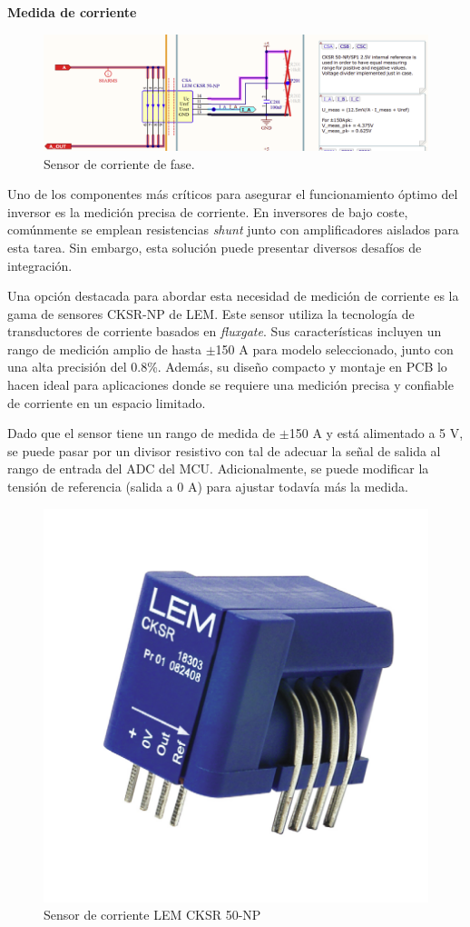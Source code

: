 \textbf{Medida de corriente}

\begin{figure}[H]
	\centering
	\includegraphics[width=0.8\linewidth]{fig/Imeas-sch}
	\caption{Sensor de corriente de fase.}
\end{figure}

Uno de los componentes más críticos para asegurar el funcionamiento óptimo del inversor es la medición precisa de corriente. En inversores de bajo coste, comúnmente se emplean resistencias \textit{shunt} junto con amplificadores aislados para esta tarea. Sin embargo, esta solución puede presentar diversos desafíos de integración.

Una opción destacada para abordar esta necesidad de medición de corriente es la gama de sensores CKSR-NP de LEM. Este sensor utiliza la tecnología de transductores de corriente basados en \textit{fluxgate}. Sus características incluyen un rango de medición amplio de hasta $\pm$150 A para modelo seleccionado, junto con una alta precisión del 0.8\%. Además, su diseño compacto y montaje en PCB lo hacen ideal para aplicaciones donde se requiere una medición precisa y confiable de corriente en un espacio limitado.

Dado que el sensor tiene un rango de medida de $\pm$150 A y está alimentado a 5 V, se puede pasar por un divisor resistivo con tal de adecuar la señal de salida al rango de entrada del ADC del MCU. Adicionalmente, se puede modificar la tensión de referencia (salida a 0 A) para ajustar todavía más la medida.

\begin{figure}[H]
	\centering
	\includegraphics[width=0.5\linewidth]{fig/cksr50}
	\caption{Sensor de corriente LEM CKSR 50-NP}
\end{figure}


